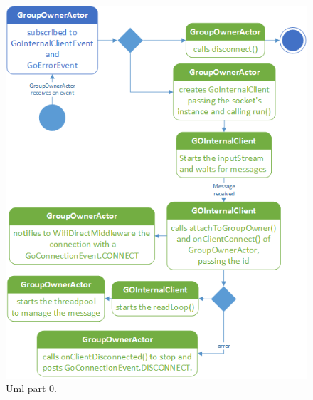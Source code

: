 \begin{figure}[thpb]
	\centering
	\includegraphics[scale=0.6]{./images/chap2/uml-parte0-3.png}
	\caption{Uml part 0.}
	\label{uml-part0-3}
\end{figure}	

